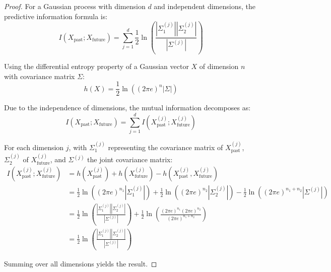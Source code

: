 \documentclass{article}
\begin{document}
\begin{proof}

For a Gaussian process with dimension $d$ and independent dimensions, the predictive information formula is:
\begin{equation}
I(X_{\text{past}}; X_{\text{future}}) = \sum_{j=1}^d \frac{1}{2} \ln \left(\frac{|\Sigma_1^{(j)}||\Sigma_2^{(j)}|}{|\Sigma^{(j)}|}\right)
\end{equation}

Using the differential entropy property of a Gaussian vector $X$ of dimension $n$ with covariance matrix $\Sigma$:
\begin{equation}
h(X) = \frac{1}{2} \ln((2\pi e)^n |\Sigma|)
\end{equation}

Due to the independence of dimensions, the mutual information decomposes as:
\begin{equation}
I(X_{\text{past}}; X_{\text{future}}) = \sum_{j=1}^d I(X_{\text{past}}^{(j)}; X_{\text{future}}^{(j)})
\end{equation}

For each dimension $j$, with $\Sigma_1^{(j)}$ representing the covariance matrix of $X_{\text{past}}^{(j)}$, $\Sigma_2^{(j)}$ of $X_{\text{future}}^{(j)}$, and $\Sigma^{(j)}$ the joint covariance matrix:
\begin{align}
I(X_{\text{past}}^{(j)}; X_{\text{future}}^{(j)}) &= h(X_{\text{past}}^{(j)}) + h(X_{\text{future}}^{(j)}) - h(X_{\text{past}}^{(j)}, X_{\text{future}}^{(j)})\\
&= \frac{1}{2}\ln((2\pi e)^{n_1}|\Sigma_1^{(j)}|) + \frac{1}{2}\ln((2\pi e)^{n_2}|\Sigma_2^{(j)}|) - \frac{1}{2}\ln((2\pi e)^{n_1+n_2}|\Sigma^{(j)}|)\\
&= \frac{1}{2}\ln\left(\frac{|\Sigma_1^{(j)}||\Sigma_2^{(j)}|}{|\Sigma^{(j)}|}\right) + \frac{1}{2}\ln\left(\frac{(2\pi e)^{n_1}(2\pi e)^{n_2}}{(2\pi e)^{n_1+n_2}}\right)\\
&= \frac{1}{2}\ln\left(\frac{|\Sigma_1^{(j)}||\Sigma_2^{(j)}|}{|\Sigma^{(j)}|}\right)
\end{align}

Summing over all dimensions yields the result.
\end{proof}
\end{document}
